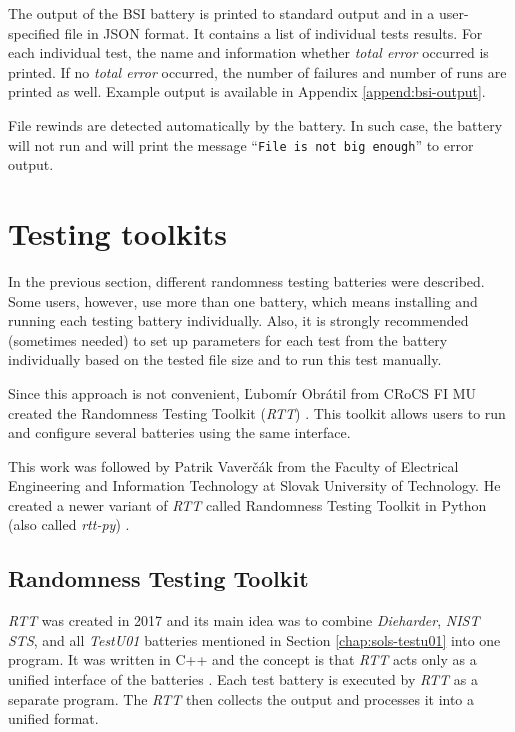 \documentclass[
  digital,     %
  oneside,     %
  nosansbold,  %
  nocolorbold, %
  nolof,         %
  nolot,         %
]{fithesis4}
\begin{document}
The output of the BSI battery is printed to standard output and in a user-specified file in JSON format. It contains a list of individual tests results. For each individual test, the name and information whether \emph{total error} occurred is printed. If no \emph{total error} occurred, the number of failures and number of runs are printed as well. Example output is available in Appendix \ref{append:bsi-output}.

File rewinds are detected automatically by the battery. In such case, the battery will not run and will print the message ``\texttt{File is not big enough}'' to error output.



\section{Testing toolkits}\label{chap:sols-toolkits}
In the previous section, different randomness testing batteries were described. Some users, however, use more than one battery, which means installing and running each testing battery individually. Also, it is strongly recommended (sometimes needed) to set up parameters for each test from the battery individually based on the tested file size and to run this test manually.

Since this approach is not convenient, Ľubomír Obrátil from CRoCS FI MU created the Randomness Testing Toolkit (\emph{RTT}) \cite{rtt-obratil}. This toolkit allows users to run and configure several batteries using the same interface.

This work was followed by Patrik Vaverčák from the Faculty of Electrical Engineering and Information Technology at Slovak University of Technology. He created a newer variant of \emph{RTT} called Randomness Testing Toolkit in Python (also called \emph{rtt-py}) \cite{rtt-py-site}. 

\subsection{Randomness Testing Toolkit} \label{chap:sols-rtt}

\emph{RTT} was created in 2017 and its main idea was to combine \emph{Dieharder}, \emph{NIST STS}, and all \emph{TestU01} batteries mentioned in Section \ref{chap:sols-testu01} into one program. It was written in C++ and the concept is that \emph{RTT} acts only as a unified interface of the batteries \cite[p.~8]{rtt-obratil}. Each test battery is executed by \emph{RTT} as a separate program. The \emph{RTT} then collects the output and processes it into a unified format.
\end{document}
